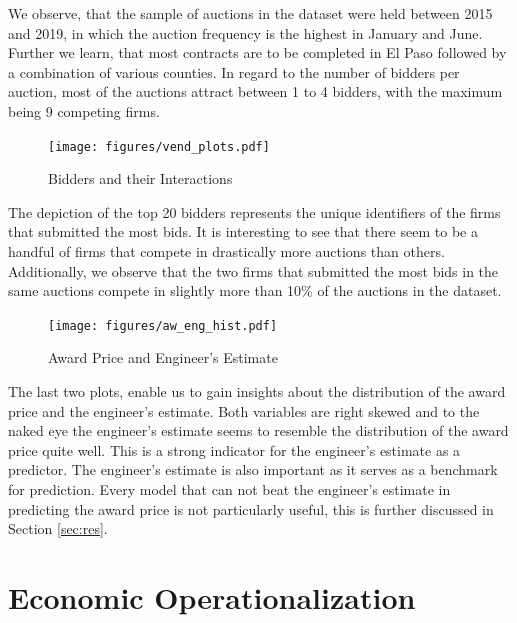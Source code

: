 \documentclass[a4paper,12pt, headsepline]{scrartcl}
\numberwithin{equation}{section}
\begin{document}
We observe, that the sample of auctions in the dataset were held between 2015 and 2019, in which the auction frequency is the highest in January and June. Further we learn, that most contracts are to be completed in El Paso followed by a combination of various counties. In regard to the number of bidders per auction, most of the auctions attract between 1 to 4 bidders, with the maximum being 9 competing firms.

\begin{figure}[H]
	\texttt{[image: figures/vend\_plots.pdf]}
	\caption{Bidders and their Interactions}\label{fig:vendplots}
\end{figure}

The depiction of the top 20 bidders represents the unique identifiers of the firms that submitted the most bids. It is interesting to see that there seem to be a handful of firms that compete in drastically more auctions than others. Additionally, we observe that the two firms that submitted the most bids in the same auctions compete in slightly more than 10\% of the auctions in the dataset.

\begin{figure}[H]
	\texttt{[image: figures/aw\_eng\_hist.pdf]}
	\caption{Award Price and Engineer's Estimate}\label{fig:aweng}
\end{figure}

The last two plots, enable us to gain insights about the distribution of the award price and the engineer's estimate. Both variables are right skewed and to the naked eye the engineer's estimate seems to resemble the distribution of the award price quite well. This is a strong indicator for the engineer's estimate as a predictor. The engineer's estimate is also important as it serves as a benchmark for prediction. Every model that can not beat the engineer's estimate in predicting the award price is not particularly useful, this is further discussed in Section \ref{sec:res}.\\
\newpage
\section{Economic Operationalization}\label{sec:op}
\end{document}
